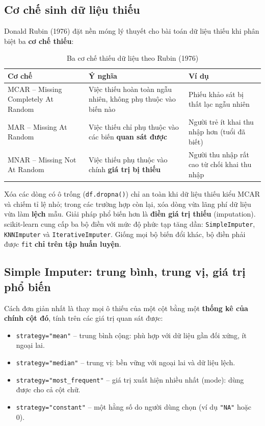 \subsection{Cơ chế sinh dữ liệu thiếu}

Donald Rubin (1976) đặt nền móng lý thuyết cho bài toán dữ liệu thiếu khi phân biệt ba \textbf{cơ chế thiếu}:

\begin{table}[H]
\centering
\begin{tabular}{|p{3.6cm}|p{5.4cm}|p{4.4cm}|}
\hline
\textbf{Cơ chế} & \textbf{Ý nghĩa} & \textbf{Ví dụ} \\
\hline
MCAR -- Missing Completely At Random & Việc thiếu hoàn toàn ngẫu nhiên, không phụ thuộc vào biến nào & Phiếu khảo sát bị thất lạc ngẫu nhiên \\ \hline
MAR -- Missing At Random & Việc thiếu chỉ phụ thuộc vào các biến \textbf{quan sát được} & Người trẻ ít khai thu nhập hơn (tuổi đã biết) \\ \hline
MNAR -- Missing Not At Random & Việc thiếu phụ thuộc vào chính \textbf{giá trị bị thiếu} & Người thu nhập rất cao từ chối khai thu nhập \\ \hline
\end{tabular}
\caption{Ba cơ chế thiếu dữ liệu theo Rubin (1976)}
\label{tab:missing-mech}
\end{table}

Xóa các dòng có ô trống (\texttt{df.dropna()}) chỉ an toàn khi dữ liệu thiếu kiểu MCAR và chiếm tỉ lệ nhỏ; trong các trường hợp còn lại, xóa dòng vừa lãng phí dữ liệu vừa làm \textbf{lệch} mẫu. Giải pháp phổ biến hơn là \textbf{điền giá trị thiếu} (imputation). scikit-learn cung cấp ba bộ điền với mức độ phức tạp tăng dần: \texttt{SimpleImputer}, \texttt{KNNImputer} và \texttt{IterativeImputer}. Giống mọi bộ biến đổi khác, bộ điền phải được \texttt{fit} \textbf{chỉ trên tập huấn luyện}.

\subsection{Simple Imputer: trung bình, trung vị, giá trị phổ biến}

Cách đơn giản nhất là thay mọi ô thiếu của một cột bằng một \textbf{thống kê của chính cột đó}, tính trên các giá trị quan sát được:
\begin{itemize}
    \item \texttt{strategy="mean"} -- trung bình cộng: phù hợp với dữ liệu gần đối xứng, ít ngoại lai.
    \item \texttt{strategy="median"} -- trung vị: bền vững với ngoại lai và dữ liệu lệch.
    \item \texttt{strategy="most\_frequent"} -- giá trị xuất hiện nhiều nhất (mode): dùng được cho cả cột chữ.
    \item \texttt{strategy="constant"} -- một hằng số do người dùng chọn (ví dụ \texttt{"NA"} hoặc 0).
\end{itemize}

